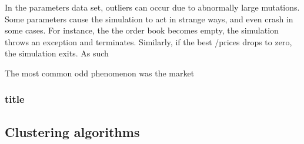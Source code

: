 In the parameters data set, outliers can occur due to abnormally large mutations. 
Some parameters cause the simulation to act in strange ways, and even crash in some cases. For instance, the the order book becomes empty, the simulation throws an exception and terminates. Similarly, if the best \bid/\ask prices drops to zero, the simulation exits. As such 

The most common odd phenomenon was the market 



\subsubsection{title}
\subsection{Clustering algorithms}
